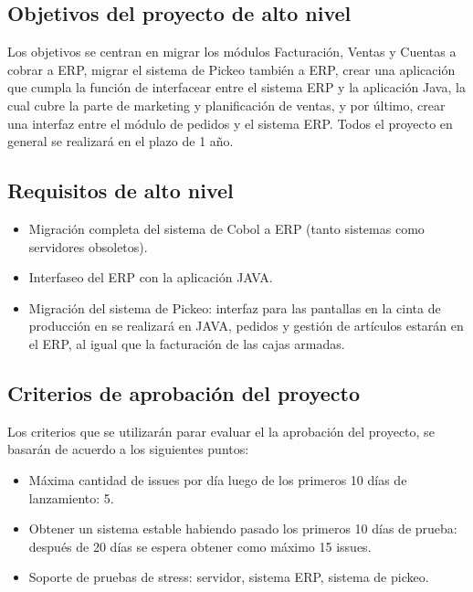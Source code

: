 \documentclass{article}
\begin{document}
\subsection{Objetivos del proyecto de alto nivel}

	Los objetivos se centran en migrar los módulos Facturación, Ventas y Cuentas a cobrar a ERP, migrar el sistema de Pickeo también a ERP, crear una aplicación que cumpla la función de interfacear entre el sistema ERP y la aplicación Java, la cual cubre la parte de marketing y planificación de ventas, y por último, crear una interfaz entre el módulo de pedidos y el sistema ERP. Todos el proyecto en general se realizará en el plazo de 1 año.
\medskip


\subsection{Requisitos de alto nivel}

	\begin{itemize}
		\itemsep=3pt \topsep=0pt \partopsep=0pt \parskip=0pt \parsep=0pt
		\item Migración completa del sistema de Cobol a ERP (tanto sistemas como servidores obsoletos).
		\item Interfaseo del ERP con la aplicación JAVA.
		\item Migración del sistema de Pickeo: interfaz para las pantallas en la cinta de producción en se realizará en JAVA, pedidos y gestión de artículos estarán en el ERP, al igual que la facturación de las cajas armadas.
	\end{itemize}

\medskip


\subsection{Criterios de aprobación del proyecto}

	Los criterios que se utilizarán parar evaluar el la aprobación del proyecto, se basarán de acuerdo a los siguientes puntos:
	\begin{itemize}
		\itemsep=3pt \topsep=0pt \partopsep=0pt \parskip=0pt \parsep=0pt
		\item Máxima cantidad de issues por día luego de los primeros 10 días de lanzamiento: 5.
		\item Obtener un sistema estable habiendo pasado los primeros 10 días de prueba: después de 20 días se espera obtener como máximo 15 issues.
		\item Soporte de pruebas de stress: servidor, sistema ERP, sistema de pickeo.
	\end{itemize}
\end{document}
